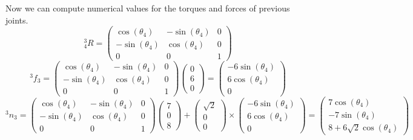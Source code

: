 \documentclass[10pt,a4paper]{article}
\begin{document}
Now we can compute numerical values for the torques and forces of previous joints.
\begin{equation*}
  {}_{4}^{3}R = \begin{pmatrix}
    \cos(\theta_{4}) & -\sin(\theta_{4}) & 0\\
    -\sin(\theta_{4}) & \cos(\theta_{4}) & 0\\
    0 & 0 & 1
  \end{pmatrix}
\end{equation*}
\begin{equation*}
  {}^{3}f_{3} = \begin{pmatrix}
    \cos(\theta_{4}) & -\sin(\theta_{4}) & 0\\
    -\sin(\theta_{4}) & \cos(\theta_{4}) & 0\\
    0 & 0 & 1
  \end{pmatrix} \begin{pmatrix}
    0\\6\\0
  \end{pmatrix} = \begin{pmatrix}
    -6\sin(\theta_{4})\\
    6\cos(\theta_{4})\\
    0
  \end{pmatrix}
\end{equation*}
\begin{equation*}
  {}^{3}n_{3} = \begin{pmatrix}
    \cos(\theta_{4}) & -\sin(\theta_{4}) & 0\\
    -\sin(\theta_{4}) & \cos(\theta_{4}) & 0\\
    0 & 0 & 1
  \end{pmatrix} \begin{pmatrix}
    7\\0\\8
  \end{pmatrix} + \begin{pmatrix}
    \sqrt{2}\\0\\0
  \end{pmatrix} \times \begin{pmatrix}
    -6\sin(\theta_{4})\\
    6\cos(\theta_{4})\\
    0
  \end{pmatrix} = \begin{pmatrix}
    7\cos(\theta_{4})\\
    -7\sin(\theta_{4})\\
    8 + 6\sqrt{2}\cos(\theta_{4})
  \end{pmatrix}
\end{equation*}
\end{document}
